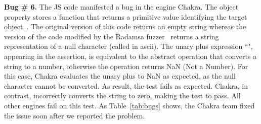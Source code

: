 \documentclass[10pt,conference,anonymous]{IEEEtran}
\begin{document}
\vspace{1ex}\noindent\textbf{Bug \# 6.} The JS code  
manifested a bug in the \js{} engine Chakra.  The object
property  stores a function that returns a primitive
value identifying the target object~\cite{valueof}. The original
version of this code returns an empty string whereas the version of
the code modified by the Radamsa fuzzer~\cite{radamsa} returns a string
representation of a null character (called  in ascii). The
unary plus expression ``", appearing in the assertion, is
equivalent to the abstract operation 
that converts a string to a number, otherwise the operation returns
NaN (Not a Number)\cite{unary-plus}. For this case, Chakra evaluates
the unary plus to NaN as expected, as the null character cannot be
converted. As result, the test fails as expected. Chakra, in contrast,
incorrectly converts the string to zero, making the test to pass. All
other engines fail on this test. As Table~\ref{tab:bugs} shows, the
Chakra team fixed the issue soon after we reported the problem.



%


\end{document}
